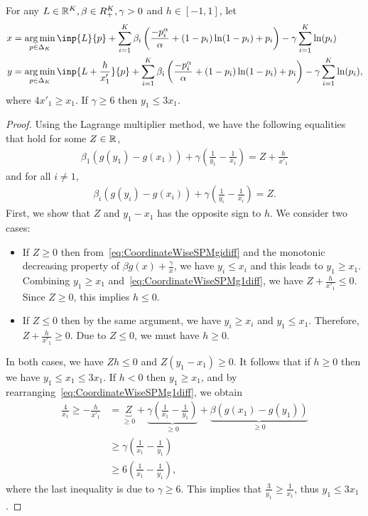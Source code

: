 \begin{lemma}
    For any $L \in \mathbb{R}^K, \beta \in R^K_{+}, \gamma > 0$ and $h \in [-1,1]$, let
    \begin{align*}
        x &= \argmin_{p \in \Delta_K} \inp{L}{p} + \sum_{i=1}^K \beta_i \left(\frac{-p_i^\alpha}{\alpha} + (1-p_i)\ln(1-p_i) + p_i\right) - \gamma \sum_{i=1}^K \ln(p_i) \\
        y &= \argmin_{p \in \Delta_K} \inp{L + \frac{h}{x'_1}}{p} + \sum_{i=1}^K \beta_i \left(\frac{-p_i^\alpha}{\alpha} + (1-p_i)\ln(1-p_i) + p_i\right) - \gamma \sum_{i=1}^K \ln(p_i),
    \end{align*}
    where $4x'_1 \geq x_1$. If $\gamma \geq 6$ then $y_1 \leq 3x_1$.
    \label{lemma:CoordinateWiseSPMSameBetaDiffLoss}
\end{lemma}
\begin{proof}
    Using the Lagrange multiplier method, we have the following equalities that hold for some $Z \in \mathbb{R}$,
    \begin{align}
        \beta_1\left( g(y_1) - g(x_1)\right) + \gamma\left(\frac{1}{y_1} - \frac{1}{x_1}\right) = Z + \frac{h}{x'_1}
        \label{eq:CoordinateWiseSPMg1diff}
    \end{align}
    and for all $i \neq 1$,
    \begin{align}
        \beta_i\left( g(y_i)- g(x_i)\right) + \gamma\left(\frac{1}{y_i} - \frac{1}{x_i}\right) = Z.
        \label{eq:CoordinateWiseSPMgidiff}
    \end{align}
    First, we show that $Z$ and $y_1 - x_1$ has the opposite sign to $h$. 
    We consider two cases:
    \begin{itemize}
        \item If $Z \geq 0$ then from~\eqref{eq:CoordinateWiseSPMgidiff} and the monotonic decreasing property of $\beta g(x) + \frac{\gamma}{x}$, we have $y_i \leq x_i$ and this leads to $y_1 \geq x_1$. Combining $y_1 \geq x_1$ and~\eqref{eq:CoordinateWiseSPMg1diff}, we have $Z + \frac{h}{x'_1} \leq 0$. Since $Z \geq 0$, this implies $h \leq 0$.
        \item If $Z \leq 0$ then by the same argument, we have $y_i \geq x_i$ and $y_1 \leq x_1$. Therefore, $Z + \frac{h}{x'_1} \geq 0$. Due to $Z \leq 0$, we must have $h \geq 0$.
    \end{itemize}
    In both cases, we have $Zh \leq 0$ and $Z(y_1 - x_1) \geq 0$. It follows that if $h \geq 0$ then we have $y_1 \leq x_1 \leq 3x_1$. If $h < 0$ then $y_1 \geq x_1$, and by rearranging~\eqref{eq:CoordinateWiseSPMg1diff}, we obtain
    \begin{align*}
        \frac{4}{x_1} \geq -\frac{h}{x'_1} &= \underbrace{Z}_{\geq 0} + \underbrace{\gamma\left(\frac{1}{x_1} - \frac{1}{y_1}\right)}_{\geq 0} + \underbrace{\beta(g(x_1) - g(y_1))}_{\geq 0} \\
        &\geq \gamma\left(\frac{1}{x_1} - \frac{1}{y_1}\right) \\
        &\geq 6\left(\frac{1}{x_1} - \frac{1}{y_1}\right),
    \end{align*}
    where the last inequality is due to $\gamma \geq 6$. This implies that $\frac{3}{y_1} \geq \frac{1}{x_1}$, thus $y_1 \leq 3x_1$.
\end{proof}

